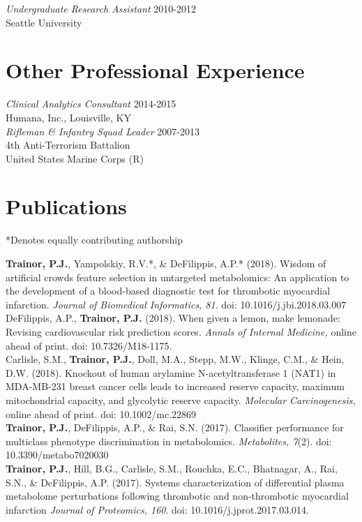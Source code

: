 \begin{DoubleSpace*}
{\emph{Undergraduate Research Assistant} \hfill 2010-2012 \\
Seattle University

\section*{Other Professional Experience}
\emph{Clinical Analytics Consultant} \hfill 2014-2015 \\
Humana, Inc., Louisville, KY \\

\emph{Rifleman \& Infantry Squad Leader} \hfill 2007-2013 \\
4th Anti-Terrorism Battalion \\
United States Marine Corps (R) 

\section*{Publications}
*Denotes equally contributing authorship 

\textbf{Trainor, P.J.}, Yampolskiy, R.V.*, \& DeFilippis, A.P.* (2018). Wisdom of artificial crowds feature selection in untargeted metabolomics: An application to the development of a blood-based diagnostic test for thrombotic myocardial infarction. \emph{Journal of Biomedical Informatics, 81}.  doi: 10.1016/j.jbi.2018.03.007  \\

DeFilippis, A.P., \textbf{Trainor, P.J.} (2018). When given a lemon, make lemonade: Revising cardiovascular risk prediction scores. \emph{Annals of Internal Medicine,} online ahead of print. doi: 10.7326/M18-1175. \\

Carlisle, S.M., \textbf{Trainor, P.J.}, Doll, M.A., Stepp, M.W., Klinge, C.M., \& Hein, D.W. (2018). Knockout of human arylamine N-acetyltransferase 1 (NAT1) in MDA-MB-231 breast
cancer cells leads to increased reserve capacity, maximum mitochondrial capacity, and glycolytic reserve capacity. \emph{Molecular Carcinogenesis,} online ahead of print. doi: 10.1002/mc.22869\\

\textbf{Trainor, P.J.}, DeFilippis, A.P., \& Rai, S.N. (2017). Classifier performance for multiclass phenotype discrimination in metabolomics. \emph{Metabolites, 7}(2). doi: 10.3390/metabo7020030 \\

\textbf{Trainor, P.J.}, Hill, B.G., Carlisle, S.M., Rouchka, E.C., Bhatnagar, A., Rai, S.N., \& DeFilippis, A.P. (2017). Systems characterization of differential plasma metabolome perturbations following thrombotic and non-thrombotic myocardial infarction \emph{Journal of Proteomics, 160}. doi: 10.1016/j.jprot.2017.03.014. \\

}
\end{DoubleSpace*}
